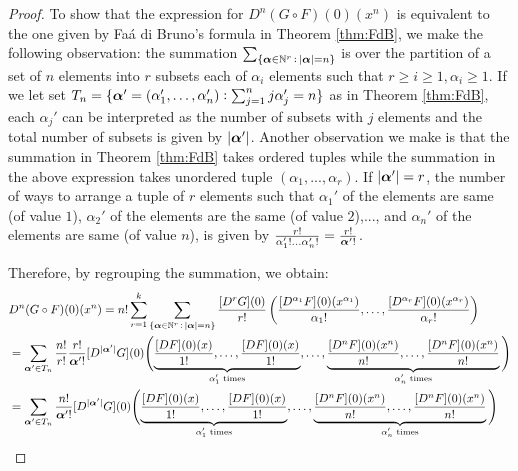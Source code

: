 \begin{proof}
To show that the expression for $D^n(G\circ F)(0)(x^n)$ is equivalent to the one given by Fa\'{a} di Bruno's formula in Theorem \ref{thm:FdB}, we make the following observation: the summation $\sum_{\{{\boldsymbol \alpha}\in\mathbb{N}^r\, :\,|{\boldsymbol \alpha}|=n \}}$ is over the partition of a set of $n$ elements into $r$ subsets each of $\alpha_i$ elements such that $r \geq i \geq 1, \alpha_i\geq 1$. If we let set $T_n = \{{\boldsymbol \alpha}' = (\alpha_1',\ldots,\alpha'_n) : \sum_{j=1}^n j\alpha_j' = n\}$ as in Theorem \ref{thm:FdB}, each $\alpha_j'$ can be interpreted as the number of subsets with $j$ elements and the total number of subsets is given by $|{\boldsymbol \alpha}'|$. Another observation we make is that the summation in Theorem \ref{thm:FdB} takes ordered tuples while the summation in the above expression takes unordered tuple $(\alpha_1,...,\alpha_r)$. If $|{\boldsymbol \alpha}'| = r$, the number of ways to arrange a tuple of $r$ elements such that $\alpha_1'$ of the elements are same (of value $1$), $\alpha_2'$ of the elements are the same (of value $2$),..., and $\alpha_n'$ of the elements are same (of value $n$), is given by $\frac{r!}{\alpha_1'!\dots\alpha_n'!} = \frac{r!}{{\boldsymbol \alpha}'!}$. 

Therefore, by regrouping the summation, we obtain: 
\begin{align*}
&D^n(G\circ F)(0)(x^n) = n!\sum_{r=1}^k
  \sum_{\{{\boldsymbol \alpha}\in\mathbb{N}^r\, :\,|{\boldsymbol \alpha}|=n \}}
  \frac{[D^rG](0)}{r!}
  \left(\frac{[D^{\alpha_1}F](0)(x^{\alpha_1})}{\alpha_1!},\dots,\frac{[D^{\alpha_r}F](0)(x^{\alpha_r})}{\alpha_r!}\right)\\
&= \sum_{{\boldsymbol \alpha}'\in T_n}\frac{n!}{r!}\frac{r!}{{\boldsymbol \alpha}'!}[D^{|{\boldsymbol \alpha}'|}G](0)\Bigg(\smash[b]{\underbrace{\frac{[DF](0)(x)}{1!},\ldots, \frac{[DF](0)(x)}{1!}}_{\text{$\alpha'_1$ times}}},\ldots,\underbrace{\frac{[D^{n}F](0)(x^n)}{n!},\ldots, \frac{[D^{n}F](0)(x^n)}{n!}}_{\text{$\alpha'_n$ times}}\Bigg)\\
&=\sum_{{\boldsymbol \alpha}'\in T_n}\frac{n!}{{\boldsymbol \alpha}'!}[D^{|{\boldsymbol \alpha}'|}G](0)\Bigg(\smash[b]{\underbrace{\frac{[DF](0)(x)}{1!},\ldots, \frac{[DF](0)(x)}{1!}}_{\text{$\alpha'_1$ times}}},\ldots,\underbrace{\frac{[D^{n}F](0)(x^n)}{n!},\ldots, \frac{[D^{n}F](0)(x^n)}{n!}}_{\text{$\alpha'_n$ times}}\Bigg)\\ 
\end{align*}
\end{proof}

